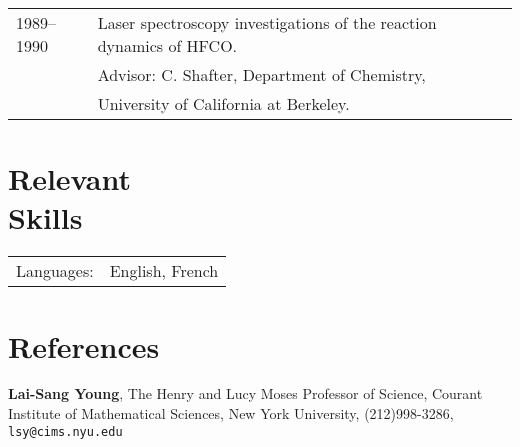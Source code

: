\documentclass[margin,line,pifont,palatino,courier]{res}
\begin{document}
\begin{resume}
\begin{tabular}{@{}p{0.8in}p{4in}}
1989--1990 & Laser spectroscopy investigations of the reaction dynamics of HFCO.\\
& \hspace{0.2in} Advisor: C. Shafter, Department of Chemistry,\\
& \hspace{0.2in} University of California at Berkeley.\\

\end{tabular}

\section{\sc Relevant \\ Skills}

\begin{tabular}{@{}p{0.8in}p{6in}}

Languages:& English, French\\

\end{tabular}




\section{\sc References}

{\bf Lai-Sang Young}, The Henry and Lucy Moses Professor of Science,
Courant Institute of Mathematical Sciences, New York University,
(212)998-3286, \texttt{lsy@cims.nyu.edu}

\end{resume}
\end{document}
